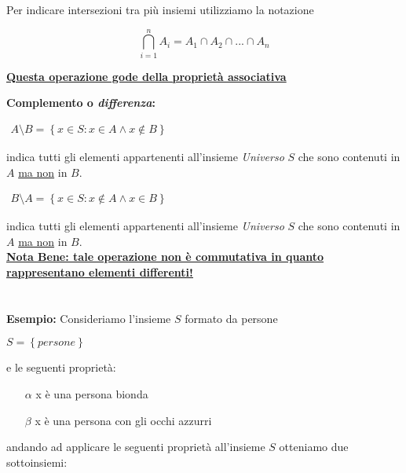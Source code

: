 \documentclass[a4paper]{article}
\newcommand{\nid}{\newline \par}
\begin{document}
Per indicare intersezioni tra più insiemi utilizziamo la notazione

\begin{equation*}
	\bigcap_{i=1}^n A_i = A_1 \cap A_2 \cap ... \cap A_n
\end{equation*}

\underline{\textbf{Questa operazione gode della proprietà associativa}}
\nid
\textbf{Complemento o \textit{differenza}: }

\begin{center}
	\begin{math}
		\begin{array}{l}
			A\setminus B = \left\lbrace x \in S:x\in A \wedge x \notin B \right\rbrace 
		\end{array}
	\end{math}
\end{center}

indica tutti gli elementi appartenenti all'insieme \textit{Universo} $S$ che sono contenuti in $A$ \underline{ma non} in $B$.

\begin{center}
	\begin{math}
		\begin{array}{l}
			B \setminus A = \left\lbrace x \in S:x\notin A \wedge x \in B \right\rbrace 
		\end{array}
	\end{math}
\end{center}

indica tutti gli elementi appartenenti all'insieme \textit{Universo} $S$ che sono contenuti in $A$ \underline{ma non} in $B$.\\

\underline{\textbf{Nota Bene: tale operazione non è commutativa in quanto rappresentano elementi differenti!}}\\ \\ \\
\textbf{Esempio:}
Consideriamo l'insieme $S$ formato da persone
\begin{center}
	\begin{math}
		S=\left\lbrace persone\right\rbrace 
	\end{math}
\end{center}
e le seguenti proprietà:\\
\begin{enumerate}
	\item[$\alpha$] x è una persona bionda
	\item[$\beta$] x è una persona con gli occhi azzurri
\end{enumerate}
andando ad applicare le seguenti proprietà all'insieme $S$ otteniamo due sottoinsiemi:
\end{document}
